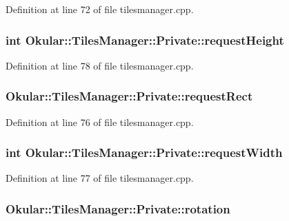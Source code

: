 Definition at line 72 of file tilesmanager.\+cpp.

\hypertarget{classTilesManager_1_1Private_a5b4e13663b908b60adc0ee7fab832bb9}{
\subsubsection[{request\+Height}]{\setlength{\rightskip}{0pt plus 5cm}int Okular\+::\+Tiles\+Manager\+::\+Private\+::request\+Height}}\label{classTilesManager_1_1Private_a5b4e13663b908b60adc0ee7fab832bb9}


Definition at line 78 of file tilesmanager.\+cpp.

\hypertarget{classTilesManager_1_1Private_a7202a07fb2d4f9d1035b6e65429cc37d}{
\subsubsection[{request\+Rect}]{ Okular\+::\+Tiles\+Manager\+::\+Private\+::request\+Rect}}\label{classTilesManager_1_1Private_a7202a07fb2d4f9d1035b6e65429cc37d}


Definition at line 76 of file tilesmanager.\+cpp.

\hypertarget{classTilesManager_1_1Private_a7fde18a61cf409f683df576fb56592b7}{
\subsubsection[{request\+Width}]{\setlength{\rightskip}{0pt plus 5cm}int Okular\+::\+Tiles\+Manager\+::\+Private\+::request\+Width}}\label{classTilesManager_1_1Private_a7fde18a61cf409f683df576fb56592b7}


Definition at line 77 of file tilesmanager.\+cpp.

\hypertarget{classTilesManager_1_1Private_a7f3af32831b85f1c108fb428b9f634d2}{
\subsubsection[{rotation}]{ Okular\+::\+Tiles\+Manager\+::\+Private\+::rotation}}\label{classTilesManager_1_1Private_a7f3af32831b85f1c108fb428b9f634d2}


